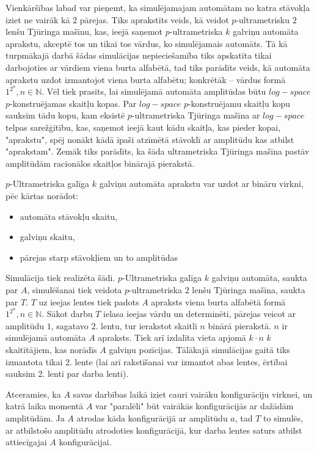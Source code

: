 \documentclass{ludis}
\begin{document}
Vienkāršības labad var pieņemt, ka simulējamajam automātam no katra stāvokļa iziet ne vairāk kā $2$ pārejas. Tiks aprakstīts veids, kā veidot $p$-ultrametrisku $2$ lenšu Tjūringa mašīnu, kas, ieejā saņemot $p$-ultrametriska $k$ galviņu automāta aprakstu, akceptē tos un tikai tos vārdus, ko simulējamais automāts. Tā kā turpmākajā darbā šādas simulācijas nepieciešamība tiks apskatīta tikai darbojoties ar vārdiem viena burta alfabētā, tad tiks parādīts veids, kā automāta aprakstu uzdot izmantojot viena burta alfabētu; konkrētāk -- vārdus formā $1^{2^n}, n \in \mathbb{N}$. Vēl tiek prasīts, lai simulējamā automāta amplitūdas būtu $log-space$ $p$-konstruējamas skaitļu kopas. Par $log-space$ $p$-konstruējamu skaitļu kopu sauksim tādu kopu, kam eksistē $p$-ultrametriska Tjūringa mašīna ar $log-space$ telpas sarežģītību, kas, saņemot ieejā kaut kādu skaitļa, kas pieder kopai, "aprakstu", spēj nonākt kādā īpaši atzīmētā stāvoklī ar amplitūdu kas atbilst "aprakstam". Zemāk tiks parādīts, ka šāda ultrametriska Tjūringa mašīna pastāv amplitūdām racionālos skaitļos binārajā pierakstā.

$p$-Ultrametriska galīga $k$ galviņu automāta aprakstu var uzdot ar bināru virkni, pēc kārtas norādot:
\begin{itemize}
	\item automāta stāvokļu skaitu,
	\item galviņu skaitu,
	\item pārejas starp stāvokļiem un to amplitūdas %
\end{itemize}

Simulācija tiek realizēta šādi. $p$-Ultrametriska galīga $k$ galviņu automāta, saukta par $A$, simulēšanai tiek veidota $p$-ultrametriska $2$ lenšu Tjūringa mašīna, saukta par $T$. $T$ uz ieejas lentes tiek padots $A$ apraksts viena burta alfabētā formā $1^{2^n}, n \in \mathbb{N}$. Sākot darbu $T$ ielasa ieejas vārdu un determinēti, pārejas veicot ar amplitūdu $1$, sagatavo 2. lentu, tur ierakstot skaitli $n$ binārā pierakstā. $n$ ir simulējamā automāta $A$ apraksts. Tiek arī izdalīta vieta apjomā $k \cdot n$ $k$ skaitītājiem, kas norādīs $A$ galviņu pozīcijas. Tālākajā simulācijas gaitā tiks izmantota tikai 2. lente (lai arī rakstīšanai var izmantot abas lentes, ērtībai sauksim 2. lenti par darba lenti).

Atceramies, ka $A$ savas darbības laikā iziet cauri vairāku konfigurāciju virknei, un katrā laika momentā $A$ var "paralēli" būt vairākās konfigurācijās ar dažādām amplitūdām. %
Ja $A$ atrodas kāda konfigurācijā ar amplitūdu $a$, tad $T$ to simulēs, ar atbilstošo amplitūdu atrodoties konfigurācijā, kur darba lentes saturs atbilst attiecīgajai $A$ konfigurācijai.
\end{document}
